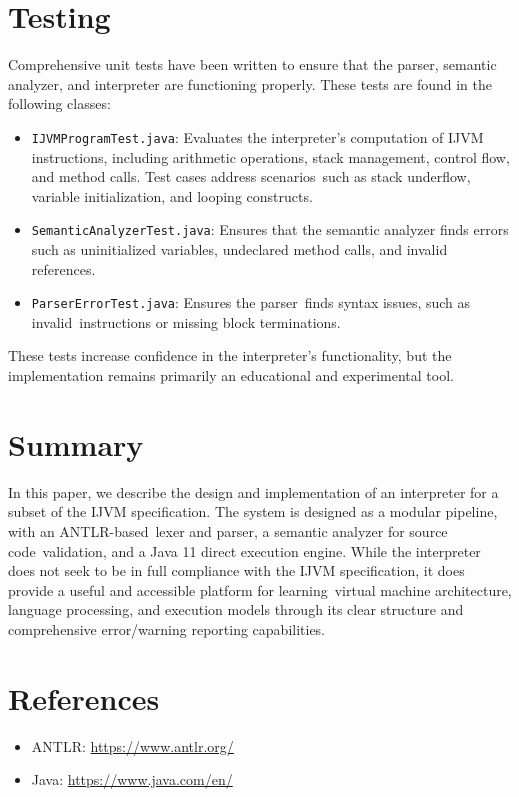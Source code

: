 \documentclass[11pt]{article}
\begin{document}
\section{Testing}
Comprehensive unit tests have been written to ensure that the parser, semantic analyzer, and interpreter are functioning properly. These tests are found in the following classes:

\begin{itemize} 
	\item \texttt{IJVMProgramTest.java}: Evaluates the interpreter's computation of IJVM instructions, including arithmetic operations, stack management, control flow, and method calls. Test cases address scenarios such as stack underflow, variable initialization, and looping constructs.
     \item \texttt{SemanticAnalyzerTest.java}: Ensures that the semantic analyzer finds errors such as uninitialized variables, undeclared method calls, and invalid references.
     \item \texttt{ParserErrorTest.java}: Ensures the parser finds syntax issues, such as invalid instructions or missing block terminations.
\end{itemize}

These tests increase confidence in the interpreter's functionality, but the implementation remains primarily an educational and experimental tool.

\section{Summary}
In this paper, we describe the design and implementation of an interpreter for a subset of the IJVM specification. The system is designed as a modular pipeline, with an ANTLR-based lexer and parser, a semantic analyzer for source code validation, and a Java 11 direct execution engine. While the interpreter does not seek to be in full compliance with the IJVM specification, it does provide a useful and accessible platform for learning virtual machine architecture, language processing, and execution models through its clear structure and comprehensive error/warning reporting capabilities.

\section*{References}
\begin{itemize}
    \item ANTLR: \url{https://www.antlr.org/}
    \item Java: \url{https://www.java.com/en/}
\end{itemize}
\end{document}

